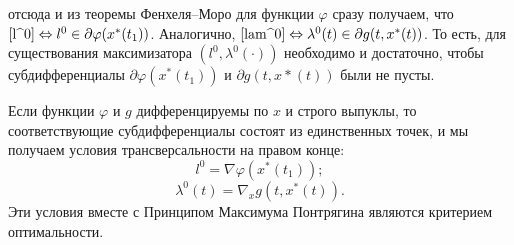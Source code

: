 отсюда и из теоремы Фенхеля--Моро для функции $ \varphi $ сразу получаем, что $ \eqref{l^0}\Leftrightarrow l^0\in\partial\varphi(x^*(t_1)) $. Аналогично, $ \eqref{lam^0}\Leftrightarrow \lambda^0(t)\in\partial g(t,x^*(t)) $. То есть, для существования максимизатора $ (l^0,\lambda^0(\cdot)) $ необходимо и достаточно, чтобы субдифференциалы $ \partial \varphi(x^*(t_1)) $ и $ \partial g(t,x*(t)) $ были не пусты.
\par Если функции $ \varphi $ и $ g $ дифференцируемы по $x$ и строго выпуклы, то соответствующие субдифференциалы состоят из единственных точек, и мы получаем условия трансверсальности  на правом конце:
\begin{equation*}
l^0= \nabla \varphi(x^*(t_1));
\end{equation*}
\begin{equation*}
\lambda^0(t)=\nabla_x g(t,x^*(t)).
\end{equation*}
Эти условия вместе с Принципом Максимума Понтрягина являются критерием оптимальности.